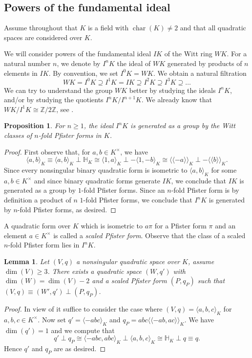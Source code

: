 \documentclass[12pt, leqno, british]{amsart}
\theoremstyle{definition}
\theoremstyle{plain}
\newtheorem{prop}[defi]{Proposition}
\newtheorem{lem}[defi]{Lemma}
\theoremstyle{remark}
\newcommand{\mbb}{\mathbb}
\newcommand{\zz}{\mbb Z}
\DeclareMathOperator{\charac}{char}
\newcommand{\llangle}{\langle\!\langle}
\newcommand{\rrangle}{\rangle\!\rangle}
\begin{document}
\subsection{Powers of the fundamental ideal}
Assume throughout that $K$ is a field with $\charac(K) \neq 2$ and that all quadratic spaces are considered over $K$.

We will consider powers of the fundamental ideal $IK$ of the Witt ring $WK$. For a natural number $n$, we denote by $I^n K$ the ideal of $WK$ generated by products of $n$ elements in $IK$.
By convention, we set $I^0K = WK$.
We obtain a natural filtration
$$ WK = I^0K \supseteq I^1 K = IK \supseteq I^2 K \supseteq I^3 K \supseteq \ldots $$
We can try to understand the group $WK$ better by studying the ideals $I^n K$, and/or by studying the quotients $I^n K / I^{n+1} K$.
We already know that $WK/I^1K \cong \zz / 2\zz$, see .
\begin{prop}\label{P:generators-InK}
For $n \geq 1$, the ideal $I^n K$ is generated as a group by the Witt classes of $n$-fold Pfister forms in $K$.
\end{prop}
\begin{proof}
First observe that, for $a, b \in K^\times$, we have
$$ \langle a, b \rangle_K \equiv \langle a, b \rangle_K \perp \mbb{H}_K \cong \langle 1, a \rangle_K \perp -\langle 1, -b \rangle_K \cong \llangle -a \rrangle_K \perp -\llangle b \rrangle_K.$$
Since every nonsingular binary quadratic form is isometric to $\langle a, b \rangle_K$ for some $a, b \in K^\times$ and since binary quadratic forms generate $IK$, we conclude that $IK$ is generated as a group by $1$-fold Pfister forms.
Since an $n$-fold Pfister form is by definition a product of $n$ $1$-fold Pfister forms, we conclude that $I^n K$ is generated by $n$-fold Pfister forms, as desired.
\end{proof}
A quadratic form over $K$ which is isometric to $a\pi$ for a Pfister form $\pi$ and an element $a \in K^\times$ is called a \emph{scaled Pfister form}.
Observe that the class of a scaled $n$-fold Pfister form lies in $I^nK$.
\begin{lem}\label{L:split-off-2fold-Pfister}
Let $(V, q)$ a nonsingular quadratic space over $K$, assume $\dim(V) \geq 3$.
There exists a quadratic space $(W, q')$ with $\dim(W) = \dim(V) - 2$ and a scaled Pfister form $(P, q_P)$ such that $(V, q) \equiv (W', q') \perp (P, q_P)$.
\end{lem}
\begin{proof}
In view of  it suffice to consider the case where $(V, q) = \langle a, b, c \rangle_K$ for $a, b, c \in K^\times$.
Now set $q' = \langle -abc \rangle_K$ and $q_P = abc\llangle -ab, ac \rrangle_K$.
We have $\dim(q') = 1$ and we compute that
$$q' \perp q_P \cong \langle -abc , abc \rangle_K \perp \langle a, b, c \rangle_K \cong \mbb{H}_K \perp q \equiv q.$$
Hence $q'$ and $q_P$ are as desired.
\end{proof}
\end{document}
